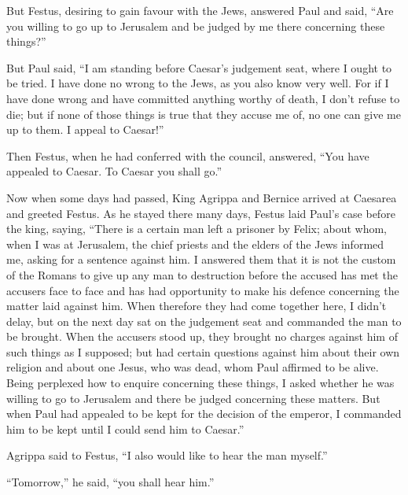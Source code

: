  But Festus, desiring to gain favour with the Jews, answered
Paul and said, ``Are you willing to go up to Jerusalem and be judged by
me there concerning these things?''

 But Paul said, ``I am standing before Caesar's judgement
seat, where I ought to be tried. I have done no wrong to the Jews, as
you also know very well.  For if I have done wrong and have
committed anything worthy of death, I don't refuse to die; but if none
of those things is true that they accuse me of, no one can give me up to
them. I appeal to Caesar!''

 Then Festus, when he had conferred with the council,
answered, ``You have appealed to Caesar. To Caesar you shall go.''

 Now when some days had passed, King Agrippa and Bernice
arrived at Caesarea and greeted Festus.  As he stayed there
many days, Festus laid Paul's case before the king, saying, ``There is a
certain man left a prisoner by Felix;  about whom, when I
was at Jerusalem, the chief priests and the elders of the Jews informed
me, asking for a sentence against him.  I answered them
that it is not the custom of the Romans to give up any man to
destruction before the accused has met the accusers face to face and has
had opportunity to make his defence concerning the matter laid against
him.  When therefore they had come together here, I didn't
delay, but on the next day sat on the judgement seat and commanded the
man to be brought.  When the accusers stood up, they
brought no charges against him of such things as I supposed;
 but had certain questions against him about their own
religion and about one Jesus, who was dead, whom Paul affirmed to be
alive.  Being perplexed how to enquire concerning these
things, I asked whether he was willing to go to Jerusalem and there be
judged concerning these matters.  But when Paul had
appealed to be kept for the decision of the emperor, I commanded him to
be kept until I could send him to Caesar.''

 Agrippa said to Festus, ``I also would like to hear the
man myself.''

``Tomorrow,'' he said, ``you shall hear him.''

